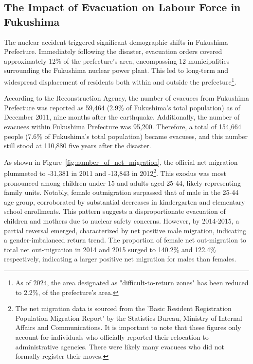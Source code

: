 \documentclass[a4paper,12pt]{article}
\begin{document}


\subsection{The Impact of Evacuation on Labour Force in Fukushima}
\label{sec4.1}
The nuclear accident triggered significant demographic shifts in Fukushima Prefecture. Immediately following the disaster, evacuation orders covered approximately 12\% of the prefecture's area, encompassing 12 municipalities surrounding the Fukushima nuclear power plant. This led to long-term and widespread displacement of residents both within and outside the prefecture\footnote{As of 2024, the area designated as "difficult-to-return zones" has been reduced to 2.2\%, of the prefecture’s area.}.


According to the Reconstruction Agency, the number of evacuees from Fukushima Prefecture was reported as 59,464 (2.9\% of Fukushima's total population) as of December 2011, nine months after the earthquake. Additionally, the number of evacuees within Fukushima Prefecture was 95,200. Therefore, a total of 154,664 people (7.6\% of Fukushima's total population) became evacuees, and this number still stood at 110,880 five years after the disaster.


As shown in Figure~\ref{fig:number_of_net_migration}, the official net migration plummeted to -31,381 in 2011 and -13,843 in 2012\footnote{The net migration data is sourced from the 'Basic Resident Registration Population Migration Report' by the Statistics Bureau, Ministry of Internal Affairs and Communications. It is important to note that these figures only account for individuals who officially reported their relocation to administrative agencies. There were likely many evacuees who did not formally register their moves.}. This exodus was most pronounced among children under 15 and adults aged 25-44, likely representing family units. Notably, female outmigration surpassed that of male in the 25-44 age group, corroborated by substantial decreases in kindergarten and elementary school enrollments. This pattern suggests a disproportionate evacuation of children and mothers due to nuclear safety concerns. However, by 2014-2015, a partial reversal emerged, characterized by net positive male migration, indicating a gender-imbalanced return trend. The proportion of female net out-migration to total net out-migration in 2014 and 2015 surged to 140.2\% and 122.4\% respectively, indicating a larger positive net migration for males than females. 
\end{document}

